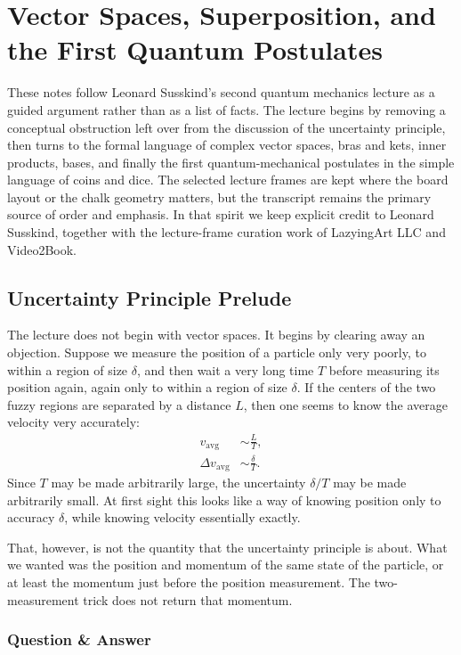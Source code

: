 \chapter{Vector Spaces, Superposition, and the First Quantum Postulates}

These notes follow Leonard Susskind's second quantum mechanics lecture as a guided argument rather than as a list of facts. The lecture begins by removing a conceptual obstruction left over from the discussion of the uncertainty principle, then turns to the formal language of complex vector spaces, bras and kets, inner products, bases, and finally the first quantum-mechanical postulates in the simple language of coins and dice. The selected lecture frames are kept where the board layout or the chalk geometry matters, but the transcript remains the primary source of order and emphasis. In that spirit we keep explicit credit to Leonard Susskind, together with the lecture-frame curation work of LazyingArt LLC and Video2Book.

\section{Uncertainty Principle Prelude}

The lecture does not begin with vector spaces. It begins by clearing away an objection. Suppose we measure the position of a particle only very poorly, to within a region of size \(\delta\), and then wait a very long time \(T\) before measuring its position again, again only to within a region of size \(\delta\). If the centers of the two fuzzy regions are separated by a distance \(L\), then one seems to know the average velocity very accurately:
\begin{align}
v_{\mathrm{avg}} &\sim \frac{L}{T},\\
\Delta v_{\mathrm{avg}} &\sim \frac{\delta}{T}.
\end{align}
Since \(T\) may be made arbitrarily large, the uncertainty \(\delta/T\) may be made arbitrarily small. At first sight this looks like a way of knowing position only to accuracy \(\delta\), while knowing velocity essentially exactly.

That, however, is not the quantity that the uncertainty principle is about. What we wanted was the position and momentum of the same state of the particle, or at least the momentum just before the position measurement. The two-measurement trick does not return that momentum.

\subsection{Question \& Answer}

